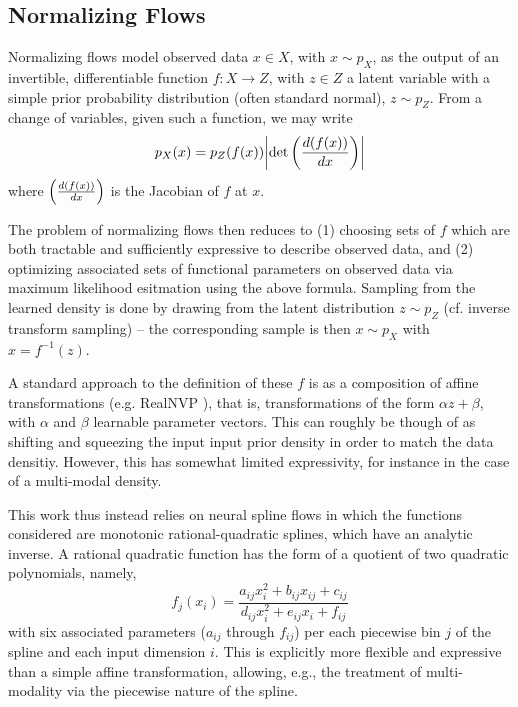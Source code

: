 \subsection{Normalizing Flows}
Normalizing flows model observed data $x\in X$, with $x \sim p_{X}$, as the output of an 
invertible, differentiable function $f: X \rightarrow Z$, with $z\in Z$ a latent 
variable with a simple prior probability distribution (often standard normal), $z\sim p_{Z}$. 
From a change of variables, given such a function, we may write
\begin{equation}
p_{X}(x) = p_{Z}(f(x))\qty|\det\qty(\frac{d(f(x))}{dx})|
\end{equation}
where $\qty(\frac{d(f(x))}{dx})$ is the Jacobian of $f$ at $x$.

The problem of normalizing flows then reduces to (1) choosing sets of $f$ which are 
both tractable and sufficiently expressive to describe observed data, and (2) optimizing 
associated sets of functional parameters on observed data via maximum likelihood esitmation 
using the above formula. Sampling from the learned density is done by drawing from the 
latent distribution $z\sim p_Z$ (cf. inverse transform sampling) -- the corresponding 
sample is then $x\sim p_X$ with $x=f^{-1}(z)$.

A standard approach to the definition of these $f$ is as a composition of affine transformations (e.g. 
RealNVP ), 
that is, transformations of the form $\alpha z + \beta$, with $\alpha$ and $\beta$ learnable 
parameter vectors. This can roughly be though of as shifting and squeezing the input
input prior density in order to match the data densitiy. However, this has somewhat limited expressivity, 
for instance in the case of a multi-modal density.

This work thus instead relies on neural spline flows  
in which the functions considered are monotonic rational-quadratic splines, which have an analytic inverse.
A rational quadratic function has the form of a quotient of two quadratic polynomials, namely,
\begin{equation}
f_j(x_i) = \frac{a_{ij} x_i^2 + b_{ij} x_{ij} + c_{ij}}{d_{ij}x_i^2 + e_{ij} x_i + f_{ij}}
\end{equation}
with six associated parameters ($a_{ij}$ through $f_{ij}$) per each piecewise bin $j$ of the spline and 
each input dimension $i$. This is explicitly more flexible and expressive than a simple affine 
transformation, allowing, e.g., the treatment of multi-modality via the piecewise nature of the spline. 

